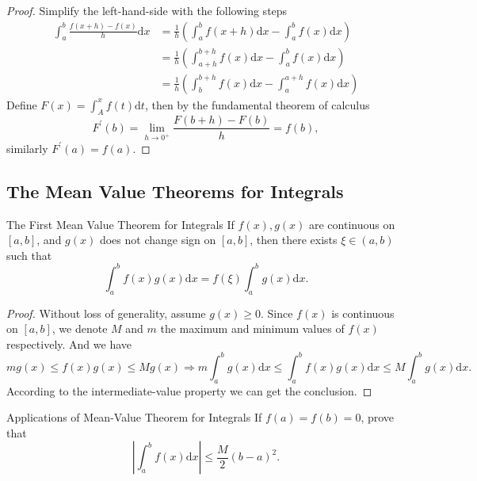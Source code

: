 \begin{proof}
  Simplify the left-hand-side with the following steps
  \begin{align}
    \int_a^b \frac{f(x+h) - f(x)}{h}\mathrm{d} x &= \frac{1}{h} \left( \int_a^b f(x+h)\mathrm{d} x - \int_a^b f(x)\mathrm{d}x \right)\\
    &= \frac{1}{h} \left( \int_{a+h}^{b+h} f(x)\mathrm{d} x - \int_a^b f(x)\mathrm{d} x \right)\\
    &= \frac{1}{h} \left( \int _b^{b+h} f(x)\mathrm{d} x - \int_a^{a+h} f(x)\mathrm{d} x \right)
  \end{align}
  Define $F(x) = \int_A^xf(t)\mathrm{d}t$,
  then by the fundamental theorem of calculus
  \begin{equation}
    F^{\prime}(b) = \lim \limits _{h \rightarrow 0^+} \frac{F(b + h) - F(b)}{h} = f(b),
  \end{equation}
  similarly $F^{\prime}(a) = f(a)$.
\end{proof}

\subsection{The Mean Value Theorems for Integrals}

\begin{theorem}{The First Mean Value Theorem for Integrals}{}
  If $f(x), g(x)$ are continuous on $[a, b]$,
  and $g(x)$ does not change sign on $[a, b]$,
  then there exists $\xi \in (a, b)$ such that
  \begin{equation}
    \int_a^b f(x) g(x) \mathrm{d} x = f(\xi) \int_a^b g(x) \mathrm{d} x.
  \end{equation}
\end{theorem}

\begin{proof}
  Without loss of generality,
  assume $g(x) \geq 0$. Since $f(x)$ is continuous on $[a, b]$,
  we denote $M$ and $m$ the maximum and minimum values of $f(x)$ respectively.
  And we have
  \begin{equation}
    m g(x) \leq f(x)g(x) \leq Mg(x) \Rightarrow
    m \int_a^b g(x)\mathrm{d} x \leq \int_a^b f(x)g(x)\mathrm{d} x \leq M \int_a^b g(x)\mathrm{d} x.
  \end{equation}
  According to the intermediate-value property we can get the conclusion.
\end{proof}

\begin{example}{Applications of Mean-Value Theorem for Integrals}{}
  If $f(a) = f(b) = 0$, prove that
  \begin{equation}
    \left| \int_a^b f(x)\mathrm{d} x \right| \leq \frac{M}{2} (b - a)^2.
  \end{equation}
\end{example}

